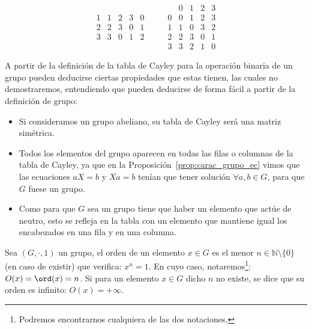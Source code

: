 \begin{ejemplo}
\begin{enumerate}
\begin{equation*}
\begin{array}{c|cccc}
                    1 & 1 & 2 & 3 & 0 \\
                    2 & 2 & 3 &  0 & 1 \\
                    3 & 3 & 0 & 1 & 2
                \end{array} \qquad 
                \begin{array}{c|cccc}
                     & 0 & 1 & 2 & 3 \\
                     \hline 
                    0 & 0 & 1 & 2 & 3 \\
                    1 & 1 & 0 & 3  & 2\\
                    2& 2 & 3 & 0 & 1 \\ 
                    3 & 3 & 2 & 1 & 0
                \end{array}
            \end{equation*}
    \end{enumerate}
    A partir de la definición de la tabla de Cayley para la operación binaria de un grupo pueden deducirse ciertas propiedades que estas tienen, las cuales no demostraremos, entendiendo que pueden deducirse de forma fácil a partir de la definición de grupo:
    \begin{itemize}
        \item Si consideramos un grupo abeliano, su tabla de Cayley será una matriz simétrica.
        \item Todos los elementos del grupo aparecen en todas las filas o columnas de la tabla de Cayley, ya que en la Proposición~\ref{prop:carac_grupo_ec} vimos que las ecuaciones $aX=b$ y $Xa=b$ tenían que tener solución $\forall a,b\in G$, para que $G$ fuese un grupo.
        \item Como para que $G$ sea un grupo tiene que haber un elemento que actúe de neutro, esto se refleja en la tabla con un elemento que mantiene igual los encabezados en una fila y en una columna.
    \end{itemize}
\end{ejemplo}

\begin{definicion}
    Sea $(G,\cdot,1)$ un grupo, el orden de un elemento $x\in G$ es el menor $n\in \mathbb{N}\setminus\{0\}$ (en caso de existir) que verifica: $x^n = 1$. En cuyo caso, notaremos\footnote{Podremos encontrarnos cualquiera de las dos notaciones.}: $O(x) = \ord(x) = n$.\newline
    Si para un elemento $x\in G$ dicho $n$ no existe, se dice que su orden es infinito: $O(x) = +\infty$.
\end{definicion}

